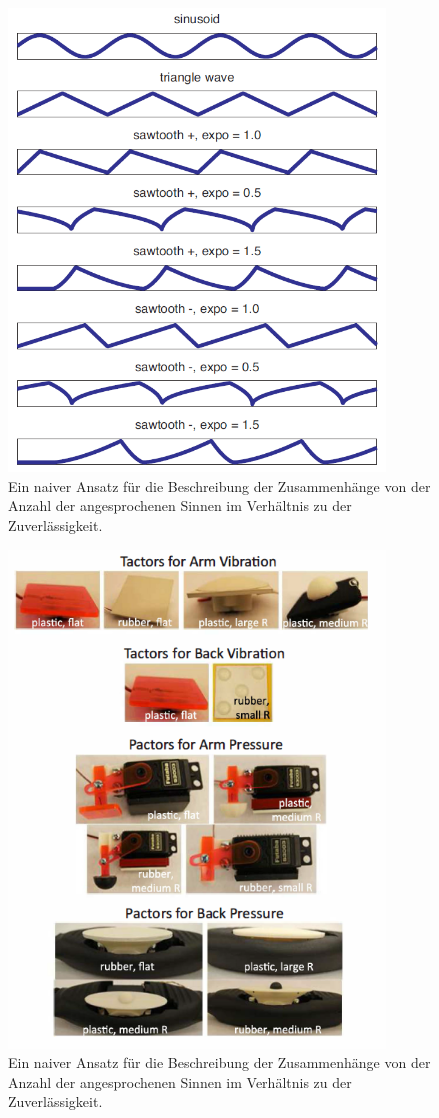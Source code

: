 \documentclass{llncs}					%
\begin{document}
\begin{figure}[htbp]
	\begin{center}
		\includegraphics[width = 10cm]{Grafiken/2-Aktivierungsprofile.png}
		\caption{Ein naiver Ansatz für die Beschreibung der Zusammenhänge von der Anzahl der angesprochenen Sinnen im Verhältnis zu der Zuverlässigkeit.}
		\label{2-Aktivierungsprofile.png}
	\end{center}
\end{figure}

\begin{figure}[htbp]
	\begin{center}
		\includegraphics[width = 10cm]{Grafiken/3-Haptische-Aktuatoren.png}
		\caption{Ein naiver Ansatz für die Beschreibung der Zusammenhänge von der Anzahl der angesprochenen Sinnen im Verhältnis zu der Zuverlässigkeit.}
		\label{3-Haptische-Aktuatoren}
	\end{center}
\end{figure}
\end{document}
